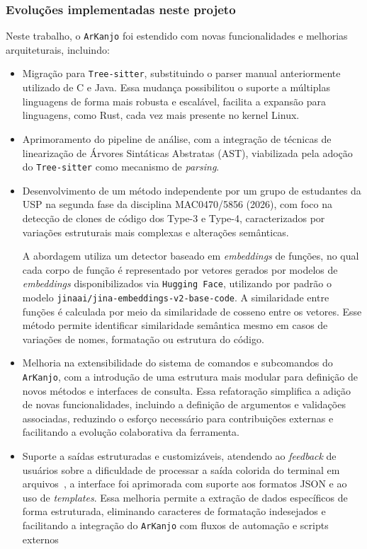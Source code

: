 \documentclass[twocolumn]{article}
\begin{document}
\subsubsection{Evoluções implementadas neste projeto}

Neste trabalho, o \texttt{ArKanjo} foi estendido com novas funcionalidades e melhorias arquiteturais, incluindo:

\begin{itemize}
    \item Migração para \texttt{Tree-sitter}, substituindo o parser manual anteriormente utilizado de C e Java. Essa  mudança possibilitou o suporte a múltiplas linguagens de forma mais robusta e escalável, facilita a expansão para linguagens, como Rust, cada vez mais presente no kernel Linux.

    \item Aprimoramento do pipeline de análise, com a integração de técnicas de linearização de Árvores Sintáticas Abstratas (AST), viabilizada pela adoção do \texttt{Tree-sitter} como mecanismo de \textit{parsing}.

    \item Desenvolvimento de um método independente por um grupo de estudantes da USP na segunda fase da disciplina MAC0470/5856 (2026), com foco na detecção de clones de código dos Type-3 e Type-4, caracterizados por variações estruturais mais complexas e alterações semânticas.

    A abordagem utiliza um detector baseado em \textit{embeddings} de funções, no qual cada corpo de função é representado por vetores gerados por modelos de \textit{embeddings} disponibilizados via \texttt{Hugging Face}, utilizando por padrão o modelo \texttt{jinaai/jina-embeddings-v2-base-code}. A similaridade entre funções é calculada por meio da similaridade de cosseno entre os vetores. Esse método permite identificar similaridade semântica mesmo em casos de variações de nomes, formatação ou estrutura do código.

    \item Melhoria na extensibilidade do sistema de comandos e subcomandos do \texttt{ArKanjo}, com a introdução de uma estrutura mais modular para definição de novos métodos e interfaces de consulta. Essa refatoração simplifica a adição de novas funcionalidades, incluindo a definição de argumentos e validações associadas, reduzindo o esforço necessário para contribuições externas e facilitando a evolução colaborativa da ferramenta.

    \item Suporte a saídas estruturadas e customizáveis, atendendo ao \textit{feedback} de usuários sobre a dificuldade de processar a saída colorida do terminal em arquivos~\cite{arcanjotese}, a interface foi aprimorada com suporte aos formatos JSON e ao uso de \textit{templates}. Essa melhoria permite a extração de dados específicos de forma estruturada, eliminando caracteres de formatação indesejados e facilitando a integração do \texttt{ArKanjo} com fluxos de automação e scripts externos
\end{itemize}
\end{document}
